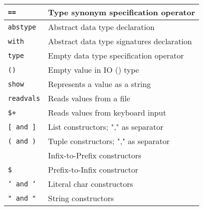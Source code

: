 \documentclass[]{article}
\begin{document}
\begin{minipage}[t][0pt]{\linewidth}
\begin{tabular}{ | l | l | }
	\texttt{==}                     & Type synonym specification operator               \\ \hline
	\texttt{abstype}                & Abstract data type declaration                    \\ \hline
	\texttt{with}                   & Abstract data type signatures declaration         \\ \hline
	\texttt{type}                   & Empty data type specification operator            \\ \hline
	\texttt{()}                     & Empty value in IO () type                         \\ \hline
	\hline
	\texttt{show}                   & Represents a value as a string                    \\ \hline
	\texttt{readvals}               & Reads values from a file                          \\ \hline
	\texttt{\$+}                    & Reads values from keyboard input                  \\ \hline
	\hline
	\texttt{[ and ]}                & List constructors; "," as separator               \\ \hline
	\texttt{( and )}                & Tuple constructors; "," as separator              \\ 
	                                & Infix-to-Prefix constructors                      \\ \hline
	\texttt{\$}                     & Prefix-to-Infix constructor                       \\ \hline
	\texttt{' and '}                & Literal char constructors                         \\ \hline
	\texttt{" and "}                & String constructors                               \\ \hline
\end{tabular}

\end{minipage}
\end{document}
